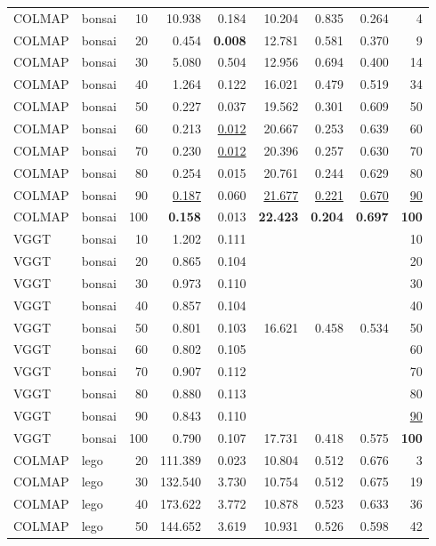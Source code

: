 \begin{table}[H]
\begin{tabular}{llrrrrrrr}
\midrule
COLMAP & bonsai & 10 & 10.938 & 0.184 & 10.204 & 0.835 & 0.264 & 4 \\
COLMAP & bonsai & 20 & 0.454 & \textbf{0.008} & 12.781 & 0.581 & 0.370 & 9 \\
COLMAP & bonsai & 30 & 5.080 & 0.504 & 12.956 & 0.694 & 0.400 & 14 \\
COLMAP & bonsai & 40 & 1.264 & 0.122 & 16.021 & 0.479 & 0.519 & 34 \\
COLMAP & bonsai & 50 & 0.227 & 0.037 & 19.562 & 0.301 & 0.609 & 50 \\
COLMAP & bonsai & 60 & 0.213 & \underline{0.012} & 20.667 & 0.253 & 0.639 & 60 \\
COLMAP & bonsai & 70 & 0.230 & \underline{0.012} & 20.396 & 0.257 & 0.630 & 70 \\
COLMAP & bonsai & 80 & 0.254 & 0.015 & 20.761 & 0.244 & 0.629 & 80 \\
COLMAP & bonsai & 90 & \underline{0.187} & 0.060 & \underline{21.677} & \underline{0.221} & \underline{0.670} & \underline{90} \\
COLMAP & bonsai & 100 & \textbf{0.158} & 0.013 & \textbf{22.423} & \textbf{0.204} & \textbf{0.697} & \textbf{100} \\
VGGT & bonsai & 10 & 1.202 & 0.111 &  &  &  & 10 \\
VGGT & bonsai & 20 & 0.865 & 0.104 &  &  &  & 20 \\
VGGT & bonsai & 30 & 0.973 & 0.110 &  &  &  & 30 \\
VGGT & bonsai & 40 & 0.857 & 0.104 &  &  &  & 40 \\
VGGT & bonsai & 50 & 0.801 & 0.103 & 16.621 & 0.458 & 0.534 & 50 \\
VGGT & bonsai & 60 & 0.802 & 0.105 &  &  &  & 60 \\
VGGT & bonsai & 70 & 0.907 & 0.112 &  &  &  & 70 \\
VGGT & bonsai & 80 & 0.880 & 0.113 &  &  &  & 80 \\
VGGT & bonsai & 90 & 0.843 & 0.110 &  &  &  & \underline{90} \\
VGGT & bonsai & 100 & 0.790 & 0.107 & 17.731 & 0.418 & 0.575 & \textbf{100} \\
\midrule
COLMAP & lego & 20 & 111.389 & 0.023 & 10.804 & 0.512 & 0.676 & 3 \\
COLMAP & lego & 30 & 132.540 & 3.730 & 10.754 & 0.512 & 0.675 & 19 \\
COLMAP & lego & 40 & 173.622 & 3.772 & 10.878 & 0.523 & 0.633 & 36 \\
COLMAP & lego & 50 & 144.652 & 3.619 & 10.931 & 0.526 & 0.598 & 42 \\

\end{tabular}
\end{table}
